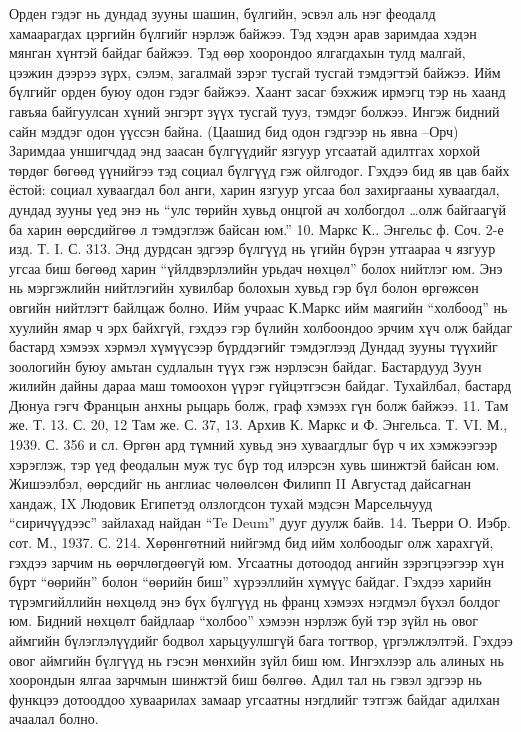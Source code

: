 Орден гэдэг нь дундад зууны шашин, бүлгийн, эсвэл аль нэг феодалд хамаарагдах цэргийн бүлгийг нэрлэж байжээ. Тэд хэдэн арав заримдаа хэдэн мянган хүнтэй байдаг байжээ. Тэд өөр хоорондоо ялгагдахын тулд малгай, цээжин дээрээ зүрх, сэлэм, загалмай зэрэг тусгай тусгай тэмдэгтэй байжээ. Ийм бүлгийг орден буюу одон гэдэг байжээ. Хаант засаг бэхжиж ирмэгц тэр нь хаанд гавъяа байгуулсан хүний энгэрт зүүх тусгай тууз, тэмдэг болжээ. Ингэж бидний сайн мэддэг одон үүссэн байна. (Цаашид бид одон гэдгээр нь явна –Орч)
Заримдаа уншигчдад энд заасан бүлгүүдийг язгуур угсаатай адилтгах хорхой төрдөг бөгөөд үүнийгээ тэд социал бүлгүүд гэж ойлгодог. Гэхдээ бид яв цав байх ёстой: социал хуваагдал бол анги, харин язгуур угсаа бол захиргааны хуваагдал, дундад зууны үед энэ нь “улс төрийн хувьд онцгой ач холбогдол …олж байгаагүй ба харин өөрсдийгөө л тэмдэглэж байсан юм.” 10. Маркс К.. Энгельс ф. Соч. 2-е изд. Т. I. С. 313.
Энд дурдсан эдгээр бүлгүүд нь үгийн бүрэн утгаараа ч язгуур угсаа биш бөгөөд харин “үйлдвэрлэлийн урьдач нөхцөл” болох нийтлэг юм. Энэ нь мэргэжлийн нийтлэгийн хувилбар болохын хувьд гэр бүл болон өргөжсөн овгийн нийтлэгт байлцаж болно. Ийм учраас К.Маркс ийм маягийн “холбоод” нь хуулийн ямар ч эрх байхгүй, гэхдээ гэр бүлийн холбоондоо эрчим хүч олж байдаг бастард хэмээх хэрмэл хүмүүсээр бүрддэгийг тэмдэглээд Дундад зууны түүхийг зоологийн буюу амьтан судлалын түүх гэж нэрлэсэн байдаг. Бастардууд Зуун жилийн дайны дараа маш томоохон үүрэг гүйцэтгэсэн байдаг. Тухайлбал, бастард Дюнуа гэгч Францын анхны рыцарь болж, граф хэмээх гүн болж байжээ. 11. Там же. Т. 13. С. 20, 12 Там же. С. 37, 13. Архив К. Маркс и Ф. Энгельса. Т. VI. М., 1939. С. 356 и сл.
Өргөн ард түмний хувьд энэ хуваагдлыг бүр ч их хэмжээгээр хэрэглэж, тэр үед феодалын муж тус бүр тод илэрсэн хувь шинжтэй байсан юм. Жишээлбэл, өөрсдийг нь англиас чөлөөлсөн Филипп II Августад дайсагнан хандаж, IX Людовик Египетэд олзлогдсон тухай мэдсэн Марсельчууд “сиричүүдээс” зайлахад найдан “Te Deum” дууг дуулж байв. 14. Тьерри О. Иэбр. сот. М., 1937. С. 214.
Хөрөнгөтний нийгэмд бид ийм холбоодыг олж харахгүй, гэхдээ зарчим нь өөрчлөгдөөгүй юм. Угсаатны дотоодод ангийн зэрэгцээгээр хүн бүрт “өөрийн” болон “өөрийн биш” хүрээллийн хүмүүс байдаг. Гэхдээ харийн түрэмгийллийн нөхцөлд энэ бүх бүлгүүд нь франц хэмээх нэгдмэл бүхэл болдог юм.
Бидний нөхцөлт байдлаар “холбоо” хэмээн нэрлэж буй тэр зүйл нь овог аймгийн бүлэглэлүүдийг бодвол харьцуулшгүй бага тогтвор, үргэлжлэлтэй. Гэхдээ овог аймгийн бүлгүүд нь гэсэн мөнхийн зүйл биш юм. Ингэхлээр аль алиных нь хоорондын ялгаа зарчмын шинжтэй биш бөлгөө. Адил тал нь гэвэл эдгээр нь функцээ дотооддоо хуваарилах замаар угсаатны нэгдлийг тэтгэж байдаг адилхан ачаалал болно.
